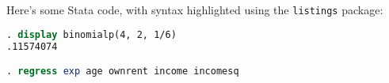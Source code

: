 \documentclass{article}
\begin{document}
\noindent Here's some Stata code, with syntax highlighted using the \texttt{listings} package:\\

\begin{lstlisting}[language=Stata, numbers=none]
. display binomialp(4, 2, 1/6)
.11574074

. regress exp age ownrent income incomesq
\end{lstlisting}
\end{document}
